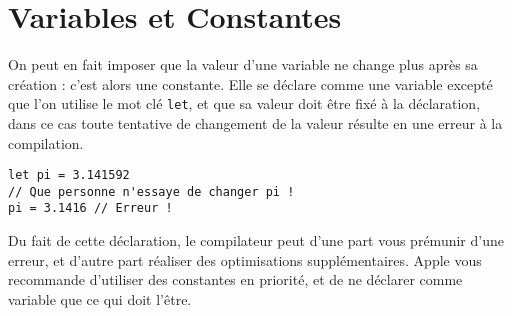 \section{Variables et Constantes}
On peut en fait imposer que la valeur d'une variable ne change plus après sa création :
c'est alors une constante. Elle se déclare comme une variable excepté que l'on utilise le
mot clé \texttt{let}, et que sa valeur doit être fixé à la déclaration, dans ce cas toute tentative de changement de la valeur résulte en une erreur à la compilation.
\begin{listing}[h]
\begin{verbatim}
let pi = 3.141592
// Que personne n'essaye de changer pi !
pi = 3.1416 // Erreur !
\end{verbatim}
\end{listing}

Du fait de cette déclaration, le compilateur peut d'une part vous prémunir d'une erreur, et
d'autre part réaliser des optimisations supplémentaires. Apple vous recommande d'utiliser
des constantes en priorité, et de ne déclarer comme variable que ce qui doit l'être.

